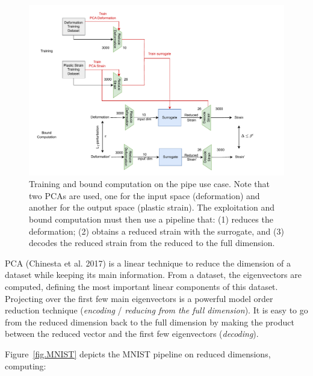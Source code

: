 \begin{figure}[h!]
    \centering
    \includegraphics[scale=0.9]{PIPE.pdf} \hspace{1.5cm}
    \caption{Training and bound computation on the pipe use case. 
    Note that two PCAs are used, one for the input space (deformation) and another for the output space (plastic strain). The exploitation and bound computation must then use a pipeline that: (1) reduces the deformation; (2) obtains a reduced strain with the surrogate, and (3) decodes the reduced strain from the reduced to the full dimension.}
    \label{fig.PIPE}
\end{figure}	


PCA (Chinesta et al. 2017) is a linear technique to reduce the dimension of a dataset while keeping its main information.
From a dataset, the eigenvectors are computed, defining the most important linear components of this dataset.
Projecting over the first few main eigenvectors is a powerful model order reduction technique ({\em encoding} / {\em reducing from the full dimension}). 
It is easy to go from the reduced dimension back to the full dimension
by making the product between the reduced vector and the first few eigenvectors ({\em decoding}).

Figure~\ref{fig.MNIST} depicts the MNIST pipeline on reduced dimensions, computing:

